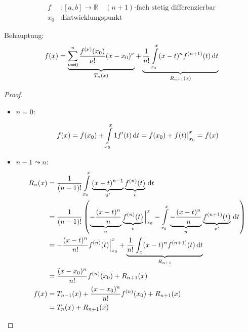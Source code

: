 \begin{align*}
	f&: [a, b] \to \mathbb{R} \quad\text{$(n+1)$-fach stetig differenzierbar} \\
	x_0&: \text{Entwicklungspunkt}
\end{align*}

Behauptung:
\begin{equation*}
	f(x) = \underbrace{\sum_{\nu = 0}^n \frac{f^{(\nu)} (x_0)}{\nu !} (x - x_0)^{\nu}}_{T_n(x)} + \underbrace{\frac{1}{n!} \int\limits_{x_0}^x (x - t)^n f^{(n+1)} (t) \,\mathrm d t}_{R_{n+1}(x)}
\end{equation*}

\begin{proof}
  \begin{itemize}
    \item $n=0$:

\begin{equation*}
	f(x) = f(x_0) + \int\limits_{x_0}^x 1 f'(t) \,\mathrm d t = f(x_0) + f(t) \big|_{x_0}^x = f(x)
\end{equation*}

    \item $n-1 \leadsto n$:
\begin{align*}
	R_n(x) &= \frac{1}{(n-1)!} \int\limits_{x_0}^x \underbrace{(x-t)^{n-1}}_{u'} \underbrace{f^{(n)}(t)}_{v} \,\mathrm d t\\
	&= \frac{1}{(n-1)!} \left( \underbrace{-\frac{(x-t)^n}{n}}_u \underbrace{f^{(n)}(t)}_v\Big|_{x_0}^x  - \int\limits_{x_0}^x \underbrace{-\frac{(x-t)^n}{n}}_u \underbrace{f^{(n+1)}(t)}_{v'} \,\mathrm d t \right) \\
	&= - \frac{(x-t)^n}{n!} f^{(n)} (t)\Big|_{x_0}^x + \underbrace{\frac{1}{n!} \int_x (x-t)^n f^{(n+1)} (t) \,\mathrm d t}_{R_{n+1}}\\
	&= \frac{(x-x_0)^n}{n!} f^{(n)} (x_0) + R_{n+1}(x)\\
	f(x) &= T_{n-1}(x) + \frac{(x-x_0)^n}{n!} f^{(n)} (x_0) + R_{n+1}(x) \\
        &= T_n(x) + R_{n+1}(x)
\end{align*}

  \end{itemize}

\end{proof}

